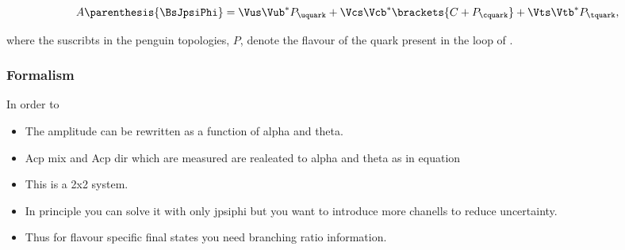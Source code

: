 \begin{equation}
  A \parenthesis{\BsJpsiPhi} = \Vus\Vub^*P_{\uquark} + \Vcs\Vcb^*\brackets{C +P_{\cquark}} + \Vts\Vtb^*P_{\tquark},
 \label{bsjpsiphi_amp}
\end{equation}

\noindent where the suscribts in the penguin topologies, $P$, denote the flavour of the quark present in the loop of .

\subsubsection{Formalism}
In order to

\begin{itemize}
  \item The amplitude can be rewritten as a function of alpha and theta.
  \item Acp mix and Acp dir which are measured are realeated to alpha and theta as in equation
  \item This is a 2x2 system.
  \item In principle you can solve it with only jpsiphi but you want to introduce more chanells to reduce uncertainty.
  \item Thus for flavour specific final states you need branching ratio information.
\end{itemize}


